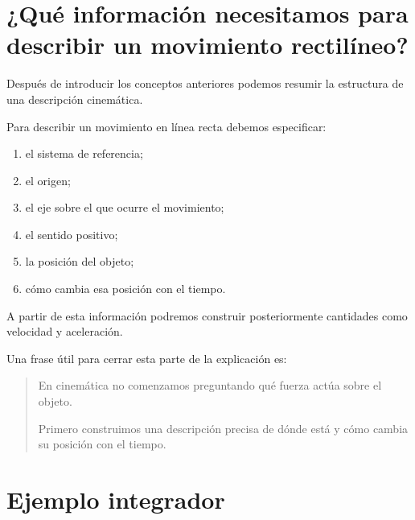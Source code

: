 \section{¿Qué información necesitamos para describir un movimiento rectilíneo?}

Después de introducir los conceptos anteriores podemos resumir la estructura
de una descripción cinemática.

Para describir un movimiento en línea recta debemos especificar:

\begin{enumerate}
    \item el sistema de referencia;
    \item el origen;
    \item el eje sobre el que ocurre el movimiento;
    \item el sentido positivo;
    \item la posición del objeto;
    \item cómo cambia esa posición con el tiempo.
\end{enumerate}

A partir de esta información podremos construir posteriormente cantidades
como velocidad y aceleración.

\begin{notapedagogica}
Una frase útil para cerrar esta parte de la explicación es:

\begin{quote}
En cinemática no comenzamos preguntando qué fuerza actúa sobre el objeto.

Primero construimos una descripción precisa de dónde está y cómo cambia su
posición con el tiempo.
\end{quote}
\end{notapedagogica}


\section{Ejemplo integrador}

